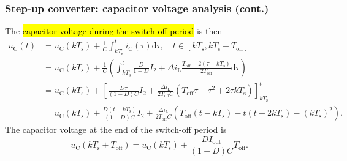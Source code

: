 \begin{frame}
    \frametitle{Step-up converter: capacitor voltage analysis (cont.)}
     The \hl{capacitor voltage during the switch-off period} is then
  \begin{equation}
      \begin{split}
          u_\mathrm{C}(t) &= u_\mathrm{C}(kT_\mathrm{s}) + \frac{1}{C}\int_{kT_\mathrm{s}}^t i_\mathrm{C}(\tau) \mathrm{d}\tau , \quad t\in [k T_\mathrm{s}, k T_\mathrm{s} + T_\mathrm{off}]\\
          &= u_\mathrm{C}(kT_\mathrm{s}) + \frac{1}{C}\left(\int_{kT_\mathrm{s}}^{t} \frac{D}{1-D}I_2 + \Delta i_\mathrm{L} \frac{T_\mathrm{off}-2(\tau-kT_\mathrm{s})}{2T_\mathrm{off}}\mathrm{d}\tau\right)\\
            &= u_\mathrm{C}(kT_\mathrm{s}) + \left[\frac{D\tau}{(1-D)C}I_2 + \frac{\Delta i_\mathrm{L}}{2T_\mathrm{off}C}\left(T_\mathrm{off}\tau - \tau^2 + 2\tau k T_\mathrm{s}\right)\right]_{kT_\mathrm{s}}^t\\
            &= u_\mathrm{C}(kT_\mathrm{s}) + \frac{D(t-kT_\mathrm{s})}{(1-D)C}I_2 + \frac{\Delta i_\mathrm{L}}{2T_\mathrm{off}C}\left(T_\mathrm{off}(t-kT_\mathrm{s}) - t(t-2kT_\mathrm{s})-(kT_\mathrm{s})^2\right).
      \end{split}
      \label{eq:capacitor-voltage-switch-off-step-up-converter}
  \end{equation}
  The capacitor voltage at the end of the switch-off period is
    \begin{equation}
        u_\mathrm{C}(kT_\mathrm{s}+T_\mathrm{off}) = u_\mathrm{C}(kT_\mathrm{s}) + \frac{DI_\mathrm{out}}{(1-D)C}T_\mathrm{off}.
    \end{equation}
\end{frame}

